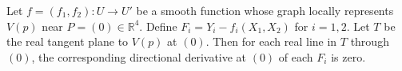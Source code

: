 Let $f = (f_1, f_2): U \to U'$ be a smooth function whose graph locally represents $V(p)$ near $P = (0) \in \mathbb{R}^4$. Define $F_i = Y_i - f_i(X_1, X_2)$ for $i = 1, 2$. Let $T$ be the real tangent plane to $V(p)$ at $(0)$. Then for each real line in $T$ through $(0)$, the corresponding directional derivative at $(0)$ of each $F_i$ is zero.
